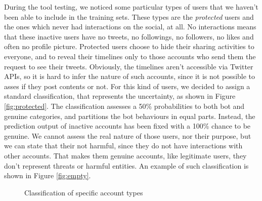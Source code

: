 During the tool testing, we noticed some particular types of users that we haven't been able to include in the training sets. These types are the \textit{protected} users and the ones which never had interactions on the social, at all. No interactions means that these inactive users have no tweets, no followings, no followers, no likes and often no profile picture.
Protected users choose to hide their sharing activities to everyone, and to reveal their timelines only to those accounts who send them the request to see their tweets. Obviously, the timelines aren't accessible via Twitter APIs, so it is hard to infer the nature of such accounts, since it is not possible to asses if they post contents or not. For this kind of users, we decided to assign a standard classification, that represents the uncertainty, as shown in Figure \ref{fig:protected}. The classification assesses a 50\% probabilities to both bot and genuine categories, and partitions the bot behaviours in equal parts.
Instead, the prediction output of inactive accounts has been fixed with a 100\% chance to be genuine. We cannot assess the real nature of those users, nor their purpose, but we can state that their not harmful, since they do not have interactions with other accounts. That makes them genuine accounts, like legitimate users, they don't represent threats or harmful entities. An example of such classification is shown in Figure \ref{fig:empty}.

\begin{figure}[htp!]
	\centering 
	\caption{Classification of specific account types}
\end{figure}
